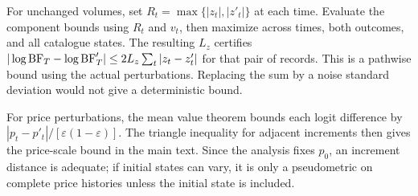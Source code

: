 For unchanged volumes, set $R_t=\max\{|z_t|,|z'_t|\}$ at each time. Evaluate the component bounds using $R_t$ and $v_t$, then maximize across times, both outcomes, and all catalogue states. The resulting $L_z$ certifies
$|\log\mathrm{BF}_T-\log\mathrm{BF}'_T|\leq2L_z\sum_t|z_t-z'_t|$ for that pair of records. This is a pathwise bound using the actual perturbations. Replacing the sum by a noise standard deviation would not give a deterministic bound.

For price perturbations, the mean value theorem bounds each logit difference by
$|p_t-p'_t|/[\varepsilon(1-\varepsilon)]$. The triangle inequality for adjacent increments then gives the price-scale bound in the main text. Since the analysis fixes $p_0$, an increment distance is adequate; if initial states can vary, it is only a pseudometric on complete price histories unless the initial state is included.

